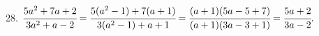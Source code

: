 28. $\cfrac{5a^2+7a+2}{3a^2+a-2}=\cfrac{5(a^2-1)+7(a+1)}{3(a^2-1)+a+1}=
\cfrac{(a+1)(5a-5+7)}{(a+1)(3a-3+1)}=\cfrac{5a+2}{3a-2}.$\\
